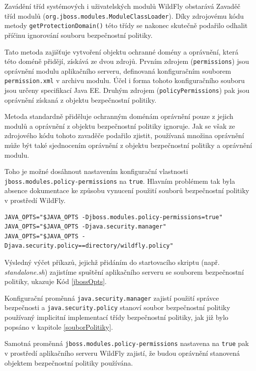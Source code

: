 Zavádění tříd systémových i uživatelských modulů WildFly obstarává Zavaděč tříd modulů ({\tt org.jboss.modules.ModuleClassLoader}). Díky zdrojovému kódu metody {\tt getProtectionDomain()} této třídy se nakonec skutečně podařilo odhalit příčinu ignorování souboru bezpečnostní politiky.

Tato metoda zajišťuje vytvoření objektu ochranné domény a oprávnění, která této doméně přidějí, získává ze dvou zdrojů. Prvním zdrojem ({\tt permissions}) jsou oprávnění modulu aplikačního serveru, definovaná konfiguračním souborem {\tt permission.xml} v archivu modulu. Účel i forma tohoto konfiguračního souboru jsou určeny specifikací Java EE. \cite{javaEEspec} Druhým zdrojem ({\tt policyPermissions}) pak jsou oprávnění získaná z objektu bezpečnostní politiky.

Metoda standardně přiděluje ochranným doménám oprávnění pouze z jejich modulů a oprávnění z objektu bezpečnostní politiky ignoruje. Jak se však ze zdrojového kódu tohoto zavaděče podařilo zjistit, používaná množina oprávnění může být také sjednocením oprávnění z objektu bezpečnostní politiky a oprávnění modulu.

Toho je možné dosáhnout nastavením konfigurační vlastnosti {\tt jboss.modules.policy-permissions} na {\tt true}. Hlavním problémem tak byla absence dokumentace ke způsobu vynucení použití souborů bezpečnostní politiky v prostředí WildFly.

\begin{lstlisting}[caption=Způsob nastavení spuštění aplikačního serveru se souborem bezpečnostní politiky, label=jbossOpts]
JAVA_OPTS="$JAVA_OPTS -Djboss.modules.policy-permissions=true"
JAVA_OPTS="$JAVA_OPTS -Djava.security.manager"
JAVA_OPTS="$JAVA_OPTS -Djava.security.policy==directory/wildfly.policy"
\end{lstlisting}

Výsledný výčet příkazů, jejichž přidáním do startovacího skriptu (např. {\it standalone.sh}) zajistíme spuštění aplikačního serveru se souborem bezpečnostní politiky, ukazuje Kód \ref{jbossOpts}.

Konfigurační proměnná {\tt java.security.manager} zajistí použití správce bezpečnosti a {\tt java.security.policy} stanoví soubor bezpečnostní politiky používaný implicitní implementací třídy bezpečnostní politiky, jak již bylo popsáno v kapitole \ref{souborPolitiky}.

Samotná proměnná {\tt jboss.modules.policy-permissions} nastavena na {\tt true} pak v prostředí aplikačního serveru WildFly zajistí, že budou oprávnění stanovená objektem bezpečnostní politiky používána.

